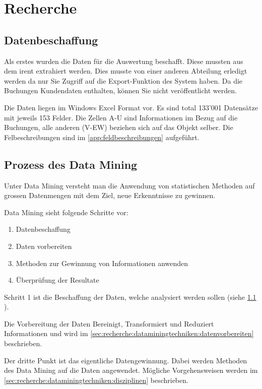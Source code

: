 \chapter{Recherche}
\label{sec:recherche}


\section{Datenbeschaffung}
\label{sec:recherche:datenbeschaffung}
Als erstes wurden die Daten für die Auswertung beschafft. Diese mussten aus dem \gls{irent} extrahiert werden. Dies musste von einer anderen Abteilung erledigt werden da nur Sie Zugriff auf die Export-Funktion des System haben. Da die Buchungen Kundendaten enthalten, können Sie nicht veröffentlicht werden.

Die Daten liegen im Windows Excel Format vor. Es sind total 133'001 Datensätze mit jeweils 153 Felder. Die Zellen A-U sind Informationen im Bezug auf die Buchungen, alle anderen (V-EW) beziehen sich auf das Objekt selber. Die Felbeschreibungen sind im \cref{app:feldbeschreibungen}  aufgeführt.

\section{Prozess des Data Mining}
\label{sec:recherche:dataminingtechniken}
Unter Data Mining versteht man die Anwendung von statistischen Methoden auf grossen Datenmengen mit dem Ziel, neue Erkenntnisse zu gewinnen.

Data Mining sieht folgende Schritte vor:
\begin{enumerate}
	\item Datenbeschaffung
	\item Daten vorbereiten
	\item Methoden zur Gewinnung von Informationen anwenden
	\item Überprüfung der Resultate
\end{enumerate}

Schritt 1 ist die Beschaffung der Daten, welche analysiert werden sollen (siehe \cref{sec:recherche:datenbeschaffung} ). 

Die Vorbereitung der Daten Bereinigt, Transformiert und Reduziert Informationen und wird im \cref{sec:recherche:dataminingtechniken:datenvorbereiten}  beschrieben.

Der dritte Punkt ist das eigentliche Datengewinnung. Dabei werden Methoden des Data Mining auf die Daten angewendet. Mögliche Vorgehensweisen werden im \cref{sec:recherche:dataminingtechniken:disziplinen}  beschrieben.

